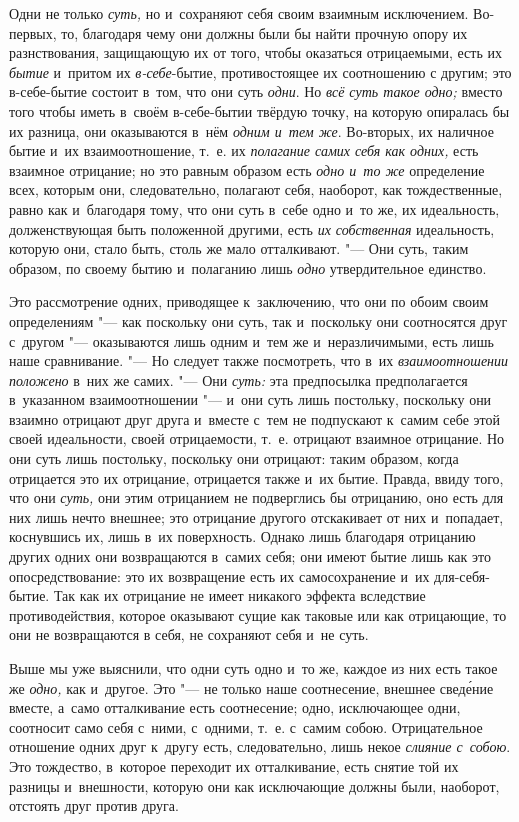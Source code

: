 Одни не только {\em суть,} но и~сохраняют себя своим взаимным исключением.
Во-первых, то, благодаря чему они должны были бы найти прочную опору их
разнствования, защищающую их от того, чтобы оказаться отрицаемыми, есть их
{\em бытие} и~притом их {\em в-себе}-бытие, противостоящее их соотношению с
другим; это в-себе-бытие состоит в~том, что они суть {\em одни}. Но
{\em всё суть такое одно;} вместо того чтобы иметь в~своём в-себе-бытии твёрдую
точку, на которую опиралась бы их разница, они оказываются в~нём
{\em одним и~тем же}. Во-вторых, их наличное бытие и~их взаимоотношение, т.~е.
их {\em полагание самих себя как одних,} есть взаимное отрицание; но это равным
образом есть {\em одно и~то же} определение всех, которым они, следовательно,
полагают себя, наоборот, как тождественные, равно как и~благодаря тому, что они
суть в~себе одно и~то же, их идеальность, долженствующая быть положенной
другими, есть {\em их собственная} идеальность, которую они, стало быть, столь
же мало отталкивают. "--- Они суть, таким образом, по своему бытию и~полаганию
лишь {\em одно} утвердительное единство.

Это рассмотрение одних, приводящее к~заключению, что они по обоим своим
определениям "--- как поскольку они суть, так и~поскольку они соотносятся друг
с~другом "--- оказываются лишь одним и~тем же и~неразличимыми, есть лишь наше
сравнивание. "--- Но следует также посмотреть, что в~их
{\em взаимоотношении положено} в~них же самих. "--- Они
{\em суть:} эта предпосылка предполагается в~указанном
взаимоотношении "--- и~они суть лишь постольку, поскольку они взаимно отрицают
друг друга и~вместе с~тем не подпускают к~самим себе этой своей
идеальности, своей отрицаемости, т.~е. отрицают взаимное отрицание. Но они
суть лишь постольку, поскольку они отрицают: таким образом, когда
отрицается это их отрицание, отрицается также и~их бытие. Правда, ввиду
того, что они {\em суть,} они этим отрицанием не
подверглись бы отрицанию, оно есть для них лишь нечто внешнее; это
отрицание другого отскакивает от них и~попадает, коснувшись их, лишь в~их
поверхность. Однако лишь благодаря отрицанию других одних они возвращаются
в~самих себя; они имеют бытие лишь как это опосредствование: это их
возвращение есть их самосохранение и~их для-себя-бытие. Так как их
отрицание не имеет никакого эффекта вследствие противодействия, которое
оказывают сущие как таковые или как отрицающие, то они не возвращаются в
себя, не сохраняют себя и~не суть.

Выше мы уже выяснили, что одни суть одно и~то же, каждое из них есть такое
же {\em одно,} как и~другое. Это "--- не только наше
соотнесение, внешнее свед\'{е}ние вместе, а~само отталкивание есть соотнесение;
одно, исключающее одни, соотносит само себя с~ними, с~одними, т.~е. с~самим
собою. Отрицательное отношение одних друг к~другу есть, следовательно, лишь
некое {\em слияние с~собою}. Это тождество, в~которое
переходит их отталкивание, есть снятие той их разницы и~внешности, которую
они как исключающие должны были, наоборот, отстоять друг против друга.

